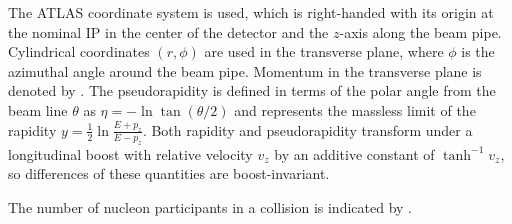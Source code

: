 The ATLAS coordinate system is used, which is right-handed with its origin at the nominal \ac{IP} in the center of the detector and the $z$-axis along the beam pipe.
Cylindrical coordinates $(r,\phi)$ are used in the transverse plane, where $\phi$ is the azimuthal angle around the beam pipe.
Momentum in the transverse plane is denoted by \pt.
The pseudorapidity is defined in terms of the polar angle from the beam line $\theta$ as $\eta=-\ln\tan(\theta/2)$ and represents the massless limit of the rapidity $y = \frac{1}{2} \ln \frac{E + p_z}{E - p_z}$.
Both rapidity and pseudorapidity transform under a longitudinal boost with relative velocity $v_z$ by an additive constant of $\tanh^{-1} v_z$, so differences of these quantities are boost-invariant.

The number of nucleon participants in a collision is indicated by \Npart.


\todo{\Npart,}
